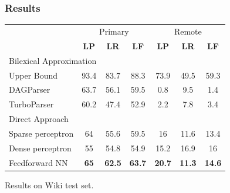 \documentclass[t]{beamer}
\begin{document}
\begin{frame}
\frametitle{Results}
\begin{center}
	\begin{tabular}{l|ccc|ccc}
	& \multicolumn{3}{c|}{Primary} & \multicolumn{3}{c}{Remote} \\
	& \textbf{LP} & \textbf{LR} & \textbf{LF} & \textbf{LP} & \textbf{LR} & \textbf{LF} \\
	\hline
	\multicolumn{4}{l}{\rule{0pt}{2ex} \footnotesize Bilexical Approximation} \\
	Upper Bound %
	& 93.4 & 83.7 & 88.3 & 73.9 & 49.5 & 59.3 \vspace{.1cm} \\
	DAGParser
	& 63.7 & 	56.1	 & 59.5	 & 0.8	 & 9.5	 &  1.4 \\
	TurboParser
	& 60.2	 & 47.4	 & 52.9	 & 2.2	 & 7.8	 &  3.4 \\
	\hline
	\multicolumn{4}{l}{\rule{0pt}{2ex} \footnotesize Direct Approach} \\
	Sparse perceptron
	& 64 & 55.6 & 59.5 & 16 & 11.6 & 13.4 \\
	Dense perceptron
	& 55 & 54.8 & 54.9 & 15.2 & 16.9 & 16 \\
	Feedforward NN
	& {\bf 65} & {\bf 62.5} & {\bf 63.7} & {\bf 20.7} & {\bf 11.3} & {\bf 14.6}
	\end{tabular}
\end{center}

Results on Wiki test set.
\end{frame}
\end{document}
